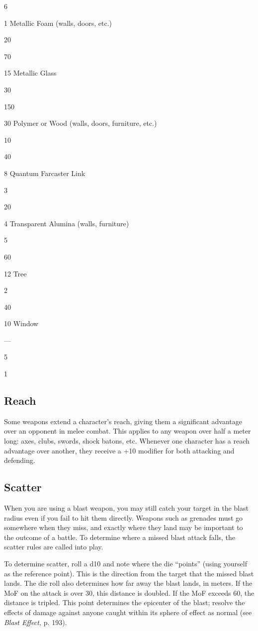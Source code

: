 6

1
Metallic Foam (walls, doors, etc.)

20

70

15
Metallic Glass

30

150

30
Polymer or Wood 
(walls, doors, furniture, etc.)

10

40

8
Quantum Farcaster Link

3

20

4
Transparent Alumina (walls, furniture)

5

60

12
Tree

2

40

10
Window

—

5

1

\subsection{Reach}

Some weapons extend a character's reach, giving 
them a significant advantage over an opponent in 
melee combat. This applies to any weapon over half 
a meter long: axes, clubs, swords, shock batons, etc. 
Whenever one character has a reach advantage over 
another, they receive a +10 modifier for both attacking 
and defending.

\subsection{Scatter}

When you are using a blast weapon, you may still 
catch your target in the blast radius even if you fail to 
hit them directly. Weapons such as grenades must go 
somewhere when they miss, and exactly where they 
land may be important to the outcome of a battle. To 
determine where a missed blast attack falls, the scatter 
rules are called into play.

To determine scatter, roll a d10 and note where the 
die ``points'' (using yourself as the reference point). 
This is the direction from the target that the missed 
blast lands. The die roll also determines how far away 
the blast lands, in meters. If the MoF on the attack is 
over 30, this distance is doubled. If the MoF exceeds 
60, the distance is tripled. This point determines the 
epicenter of the blast; resolve the effects of damage 
against anyone caught within its sphere of effect as 
normal (see \textit{Blast Effect,} p. 193).


